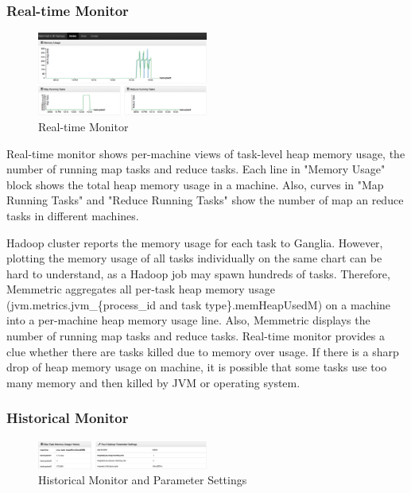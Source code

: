 \subsubsection{Real-time Monitor}

\begin{figure}[h!]
  \centering
    \includegraphics[width=0.5\textwidth]{image/real-time-monitor.png}
  \caption{Real-time Monitor}
\end{figure}

Real-time monitor shows per-machine views of task-level heap memory usage, the number of running map tasks and reduce tasks. Each line in "Memory Usage" block shows the total heap memory usage in a machine. Also, curves in "Map Running Tasks" and "Reduce Running Tasks" show the number of map an reduce tasks in different machines.

Hadoop cluster reports the memory usage for each task to Ganglia. However, plotting the memory usage of all tasks individually on the same chart can be hard to understand, as a Hadoop job may spawn hundreds of tasks. Therefore, Memmetric aggregates all per-task heap memory usage (jvm.metrics.jvm\_\{process\_id and task type\}.memHeapUsedM) on a machine into a per-machine heap memory usage line. Also, Memmetric displays the number of running map tasks and reduce tasks. Real-time monitor provides a clue whether there are tasks killed due to memory over usage. If there is a sharp drop of heap memory usage on machine, it is possible that some tasks use too many memory and then killed by JVM or operating system.

\subsubsection{Historical Monitor}

\begin{figure}[h!]
  \centering
    \includegraphics[width=0.5\textwidth]{image/historical-monitor.png}
  \caption{Historical Monitor and Parameter Settings}
\end{figure}

